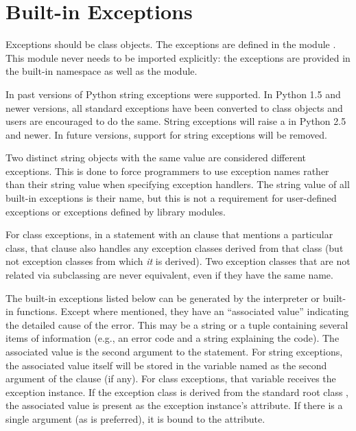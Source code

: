 \section{Built-in Exceptions}



Exceptions should be class objects.  
The exceptions are defined in the module .  This
module never needs to be imported explicitly: the exceptions are
provided in the built-in namespace as well as the 
module.

\begin{notice}
In past versions of Python string exceptions were supported.  In
Python 1.5 and newer versions, all standard exceptions have been
converted to class objects and users are encouraged to do the same.
String exceptions will raise a  in Python 2.5 and
newer.
In future versions, support for string exceptions will be removed.

Two distinct string objects with the same value are considered different
exceptions.  This is done to force programmers to use exception names
rather than their string value when specifying exception handlers.
The string value of all built-in exceptions is their name, but this is
not a requirement for user-defined exceptions or exceptions defined by
library modules.
\end{notice}

For class exceptions, in a  statement with
an  clause that mentions a particular
class, that clause also handles any exception classes derived from
that class (but not exception classes from which \emph{it} is
derived).  Two exception classes that are not related via subclassing
are never equivalent, even if they have the same name.

The built-in exceptions listed below can be generated by the
interpreter or built-in functions.  Except where mentioned, they have
an ``associated value'' indicating the detailed cause of the error.
This may be a string or a tuple containing several items of
information (e.g., an error code and a string explaining the code).
The associated value is the second argument to the
 statement.  For string exceptions, the
associated value itself will be stored in the variable named as the
second argument of the  clause (if any).  For class
exceptions, that variable receives the exception instance.  If the
exception class is derived from the standard root class
, the associated value is present as the
exception instance's  attribute.  If there is a single argument
(as is preferred), it is bound to the  attribute.

